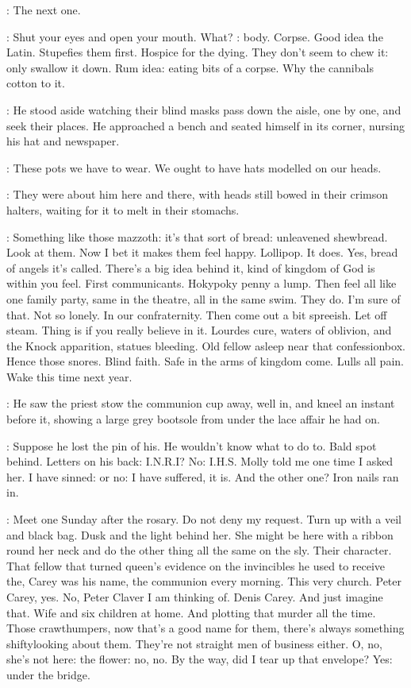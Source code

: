 :
The next one.

\BloomInt:
Shut your eyes and open your mouth.
What?
:
body.
Corpse.
Good idea the Latin.
Stupefies them first.
Hospice for the dying.
They don't seem to chew it:
only swallow it down.
Rum idea:
eating bits of a corpse.
Why the cannibals cotton to it.

:
He stood aside
watching their blind masks pass down the aisle,
one by one,
and seek their places.
He approached a bench and seated himself in its corner,
nursing his hat and newspaper.

\BloomInt:
These pots we have to wear.
We ought to have hats modelled on our heads.

:
They were about him here and there,
with heads still bowed in their crimson halters,
waiting for it to melt in their stomachs.

\BloomInt:
Something like those mazzoth:
it's that sort of bread:
unleavened shewbread.
Look at them.
Now I bet it makes them feel happy.
Lollipop.
It does.
Yes, bread of angels it's called.
There's a big idea behind it,
kind of kingdom of God is within you feel.
First communicants.
Hokypoky penny a lump.
Then feel all like one family party,
same in the theatre, all in the same swim.
They do.
I'm sure of that.
Not so lonely.
In our confraternity.
Then come out a bit spreeish.
Let off steam.
Thing is if you really believe in it.
Lourdes cure,
waters of oblivion,
and the Knock apparition,
statues bleeding.
Old fellow asleep near that confessionbox.
Hence those snores.
Blind faith.
Safe in the arms of kingdom come.
Lulls all pain.
Wake this time next year.

:
He saw the priest stow the communion cup away,
well in,
and kneel an instant before it,
showing a large grey bootsole from under the lace affair he had on.

\BloomInt:
Suppose he lost the pin of his.
He wouldn't know what to do to.
Bald spot behind.
Letters on his back:
I.N.R.I?
No:
I.H.S.
Molly told me one time I asked her.
I have sinned:
or no:
I have suffered, it is.
And the other one?
Iron nails ran in.

\BloomInt:
Meet one Sunday after the rosary.
Do not deny my request.
Turn up with a veil and black bag.
Dusk and the light behind her.
She might be here with a ribbon round her neck
and do the other thing all the same on the sly.
Their character.
That fellow that turned queen's evidence on the invincibles
he used to receive the,
Carey was his name,
the communion every morning.
This very church.
Peter Carey, yes.
No, Peter Claver I am
thinking of.
Denis Carey.
And just imagine that.
Wife and six children at home.
And plotting that murder all the time.
Those crawthumpers,
now that's a good name for them,
there's always something shiftylooking about them.
They're not straight men of business either.
O, no, she's not here:
the flower:
no, no.
By the way, did I tear up that envelope?
Yes: under the bridge.

